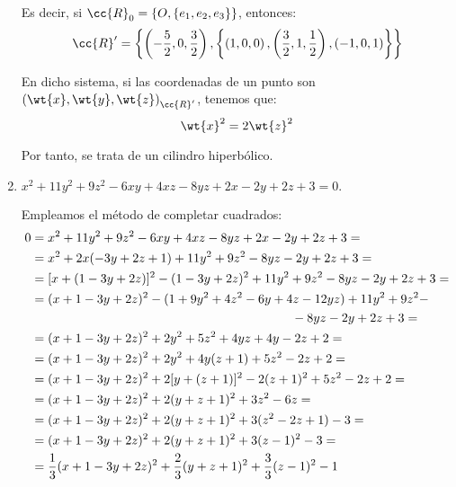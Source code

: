 \begin{ejercicio}
\begin{enumerate}
        Es decir, si $\cc{R}_0 = \{O, \{e_1,e_2,e_3\}\}$, entonces:
        \begin{equation*}
            \cc{R}' = \left\{\left(-\frac{5}{2}, 0, \frac{3}{2}\right), \left\{\left(1,0,0\right), \left(\frac{3}{2}, 1, \frac{1}{2}\right), \left(-1,0,1\right)\right\}\right\}
        \end{equation*}

        En dicho sistema, si las coordenadas de un punto son ${(\wt{x}, \wt{y}, \wt{z})}_{\cc{R}'}$, tenemos que:
        \begin{equation*}
            \wt{x}^2=2 \wt{z}^2
        \end{equation*}

        Por tanto, se trata de un cilindro hiperbólico.

        
        \item $x^2 + 11y^2 + 9z^2 - 6xy + 4xz - 8yz + 2x - 2y + 2z + 3 = 0.$

        Empleamos el método de completar cuadrados:
        \begin{equation*}
            \begin{split}
                0 &= x^2 + 11y^2 + 9z^2 - 6xy + 4xz - 8yz + 2x - 2y + 2z + 3 =\\
                &= x^2 + 2x(-3y+2z+1) + 11y^2 + 9z^2 - 8yz - 2y + 2z + 3 =\\
                &= [x+(1-3y+2z)]^2 -(1-3y+2z)^2 + 11y^2 + 9z^2 - 8yz - 2y + 2z + 3 =\\
                &= (x+1-3y+2z)^2 -(1+9y^2+4z^2-6y+4z-12yz) + 11y^2 + 9z^2-\\&\hspace{0.6\linewidth} - 8yz - 2y + 2z + 3=\\
                &= (x+1-3y+2z)^2 + 2y^2 + 5z^2 +4yz +4y - 2z + 2=\\
                &= (x+1-3y+2z)^2 + 2y^2 +4y(z+1)+ 5z^2 - 2z + 2=\\
                &= (x+1-3y+2z)^2 + 2[y+(z+1)]^2 -2(z+1)^2 + 5z^2 - 2z + 2=\\
                &= (x+1-3y+2z)^2 + 2(y+z+1)^2 + 3z^2 - 6z =\\
                &= (x+1-3y+2z)^2 + 2(y+z+1)^2 + 3(z^2-2z+1)-3=\\
                &= (x+1-3y+2z)^2 + 2(y+z+1)^2 + 3(z-1)^2-3=\\
                &= \frac{1}{3}(x+1-3y+2z)^2 + \frac{2}{3}(y+z+1)^2 + \frac{3}{3}(z-1)^2-1
            \end{split}
        \end{equation*}


\end{enumerate}
\end{ejercicio}
